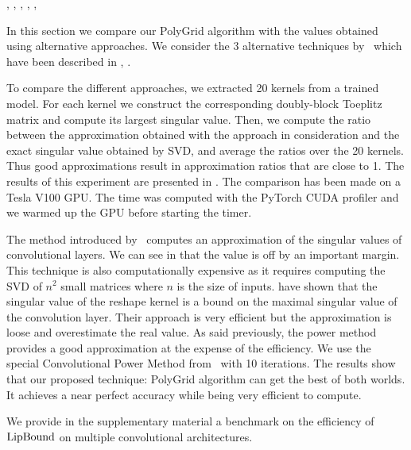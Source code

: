 \cite{krizhevsky2012imagenet}, \cite{he2016deep}, \cite{huang2017densely}, \cite{simonyan2014very}, \cite{zagoruyko2016wide}, \cite{iandola2016squeezenet}



In this section we compare our PolyGrid algorithm with the values obtained using alternative approaches.
We consider the 3 alternative techniques by~\citet{sedghi2018singular,singla2019bounding,farnia2018generalizable} which have been described in , . 

To compare the different approaches, we extracted 20 kernels from a trained model.
For each kernel we construct the corresponding doubly-block Toeplitz matrix and compute its largest singular value.
Then, we compute the ratio between the approximation obtained with the approach in consideration and the exact singular value obtained by SVD, and average the ratios over the 20 kernels.
Thus good approximations result in approximation ratios that are close to 1.
The results of this experiment are presented in .
The comparison has been made on a Tesla V100 GPU. 
The time was computed with the PyTorch CUDA profiler and we warmed up the GPU before starting the timer.

The method introduced by~\citet{sedghi2018singular} computes an approximation of the singular values of convolutional layers.
We can see in  that the value is off by an important margin.
This technique is also computationally expensive as it requires computing the SVD of $n^2$ small matrices where $n$ is the size of inputs.
\citet{singla2019bounding} have shown that the singular value of the reshape kernel is a bound on the maximal singular value of the convolution layer.
Their approach is very efficient but the approximation is loose and overestimate the real value.
As said previously, the power method provides a good approximation at the expense of the efficiency.
We use the special Convolutional Power Method from~\citet{farnia2018generalizable} with 10 iterations.
The results show that our proposed technique: PolyGrid algorithm can get the best of both worlds.
It achieves a near perfect accuracy while being very efficient to compute. 

We provide in the supplementary material a benchmark on the efficiency of $\mathrm{LipBound}$ on multiple convolutional architectures. 


